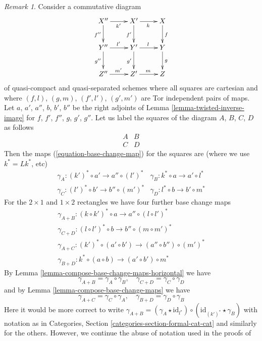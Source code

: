 \documentclass{stacks-project}
\theoremstyle{plain}
\theoremstyle{definition}
\theoremstyle{remark}
\newtheorem{remark}[subsection]{Remark}
\numberwithin{equation}{subsection}
\begin{document}
\begin{remark}
\label{remark-going-around}
Consider a commutative diagram
$$
\xymatrix{
X'' \ar[r]_{k'} \ar[d]_{f''} & X' \ar[r]_k \ar[d]_{f'} & X \ar[d]^f \\
Y'' \ar[r]^{l'} \ar[d]_{g''} & Y' \ar[r]^l \ar[d]_{g'} & Y \ar[d]^g \\
Z'' \ar[r]^{m'} & Z' \ar[r]^m & Z
}
$$
of quasi-compact and quasi-separated schemes where
all squares are cartesian and where
$(f, l)$, $(g, m)$, $(f', l')$, $(g', m')$ are
Tor independent pairs of maps.
Let $a$, $a'$, $a''$, $b$, $b'$, $b''$ be the
right adjoints of Lemma \ref{lemma-twisted-inverse-image}
for $f$, $f'$, $f''$, $g$, $g'$, $g''$.
Let us label the squares of the diagram $A$, $B$, $C$, $D$
as follows
$$
\begin{matrix}
A & B \\
C & D
\end{matrix}
$$
Then the maps (\ref{equation-base-change-map})
for the squares are (where we use $k^* = Lk^*$, etc)
$$
\begin{matrix}
\gamma_A : (k')^* \circ a' \to a'' \circ (l')^* &
\gamma_B : k^* \circ a \to a' \circ l^* \\
\gamma_C : (l')^* \circ b' \to b'' \circ (m')^* &
\gamma_D : l^* \circ b \to b' \circ m^*
\end{matrix}
$$
For the $2 \times 1$ and $1 \times 2$ rectangles we have four further
base change maps
$$
\begin{matrix}
\gamma_{A + B} : (k \circ k')^* \circ a \to a'' \circ (l \circ l')^* \\
\gamma_{C + D} : (l \circ l')^* \circ b \to b'' \circ (m \circ m')^* \\
\gamma_{A + C} : (k')^* \circ (a' \circ b') \to (a'' \circ b'') \circ (m')^* \\
\gamma_{B + D} : k^* \circ (a \circ b) \to (a' \circ b') \circ m^*
\end{matrix}
$$
By Lemma \ref{lemma-compose-base-change-maps-horizontal} we have
$$
\gamma_{A + B} = \gamma_A \circ \gamma_B, \quad
\gamma_{C + D} = \gamma_C \circ \gamma_D
$$
and by Lemma \ref{lemma-compose-base-change-maps} we have
$$
\gamma_{A + C} = \gamma_C \circ \gamma_A, \quad
\gamma_{B + D} = \gamma_D \circ \gamma_B
$$
Here it would be more correct to write
$\gamma_{A + B} = (\gamma_A \star \text{id}_{l^*}) \circ
(\text{id}_{(k')^*} \star \gamma_B)$ with notation as in
Categories, Section \ref{categories-section-formal-cat-cat}
and similarly for the others. However, we continue the
abuse of notation used in the proofs of

\end{remark}
\end{document}
